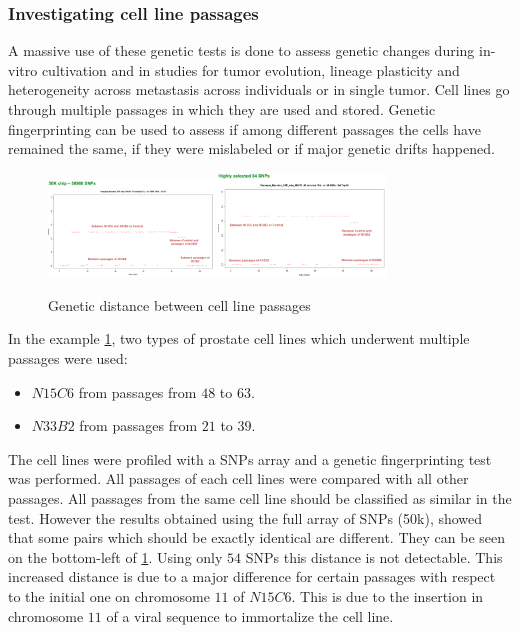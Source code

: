 		\subsubsection{Investigating cell line passages}
		A massive use of these genetic tests is done to assess genetic changes during in-vitro cultivation  and in studies for tumor evolution, lineage plasticity and heterogeneity across metastasis across individuals or in single tumor.
		Cell lines go through multiple passages in which they are used and stored.
		Genetic fingerprinting can be used to assess if among different passages the cells have remained the same, if they were mislabeled or if major genetic drifts happened.

		\begin{figure}[H]
			\centering
			\includegraphics[width=0.4\textwidth]{50k.png}\quad\includegraphics[width=0.4\textwidth]{54_snps.PNG}
			\caption{Genetic distance between cell line passages}
			\label{fig:cell_lines}
		\end{figure}

		In the example \ref{fig:cell_lines}, two types of prostate cell lines which underwent multiple passages were used:

		\begin{multicols}{2}
			\begin{itemize}
				\item $N15C6$ from passages from $48$ to $63$.
				\item $N33B2$ from passages from $21$ to $39$.
			\end{itemize}
		\end{multicols}

		The cell lines were profiled with a SNPs array and a genetic fingerprinting test was performed.
		All passages of each cell lines were compared with all other passages.
		All passages from the same cell line should be classified as similar in the test.
		However the results obtained using the full array of SNPs (50k), showed that some pairs which should be exactly identical are different.
		They can be seen on the bottom-left of \ref{fig:cell_lines}.
		Using only $54$ SNPs this distance is not detectable.
		This increased distance is due to a major difference for certain passages with respect to the initial one on chromosome $11$ of $N15C6$.
		This is due to the insertion in chromosome $11$ of a viral sequence to immortalize the cell line.

